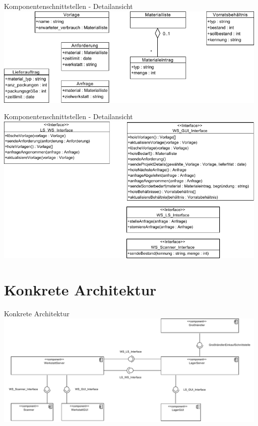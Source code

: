 \documentclass{beamer}
\begin{document}
\begin{frame}{Komponentenschnittstellen - Detailansicht}
\includegraphics[width=\linewidth]{PDF/Schnittstellen_rechts_unten.pdf}
\end{frame}
\begin{frame}{Komponentenschnittstellen - Detailansicht}
\includegraphics[height=0.75\textheight]{PDF/Schnittstellen_rechts_oben.pdf}
\end{frame}
	\section{Konkrete Architektur}
	\begin{frame}{Konkrete Architektur}
		\includegraphics[width=\textwidth]{PDF/Konkrete_Architektur.pdf}
	\end{frame}
\end{document}
